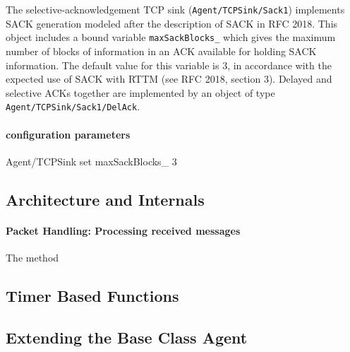 \documentclass{article}
\begin{document}
The selective-acknowledgement TCP sink ({\tt Agent/TCPSink/Sack1}) implements
SACK generation modeled after the description of SACK in RFC 2018.
This object includes a bound variable {\tt maxSackBlocks\_} which gives
the maximum number of blocks of information in an ACK available for
holding SACK information.
The default value for this variable is 3, in accordance with the expected
use of SACK with RTTM (see RFC 2018, section 3).
Delayed and selective ACKs together are implemented by
an object of type {\tt Agent/TCPSink/Sack1/DelAck}.

\paragraph{configuration parameters}
\begin{program}
Agent/TCPSink set maxSackBlocks_ 3
\end{program}

\subsection{Architecture and Internals}
\label{sec:architecture}

\paragraph{Packet Handling: Processing received messages}
The 
method

\subsection{Timer Based Functions}
\label{sec:timers}

\subsection{Extending the Base Class Agent}
\label{sec:extensions}
\end{document}
